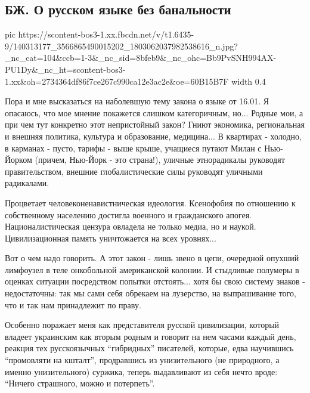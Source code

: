  
 
 
 
 

\subsection{БЖ. О русском языке без банальности}
\label{sec:18_01_2021.fb.bilchenko_evgenia.1.mova_jazyk}

\ifcmt
  pic https://scontent-bos3-1.xx.fbcdn.net/v/t1.6435-9/140313177_3566865490015202_1803062037982538616_n.jpg?_nc_cat=104&ccb=1-3&_nc_sid=8bfeb9&_nc_ohc=Bb9PvSNH994AX-PU1Dy&_nc_ht=scontent-bos3-1.xx&oh=2734364df86f7ce267c990ca12e3ac2e&oe=60B15B7F
	width 0.4
\fi

Пора и мне высказаться на наболевшую тему закона о языке от 16.01. Я опасаюсь,
что мое мнение покажется слишком категоричным, но... Родные мои, а при чем тут
конкретно этот непристойный закон? Гниют экономика, региональная и внешняя
политика, культура и образование, медицина... В квартирах - холодно, в карманах
- пусто, тарифы - выше крыше, учащиеся путают Милан с Нью-Йорком (причем,
Нью-Йорк - это страна!), уличные этнорадикалы руководят правительством, внешние
глобалистические силы руководят уличными радикалами.  

Процветает человеконенавистническая идеология. Ксенофобия по отношению к
собственному населению достигла военного и гражданского апогея.
Националистическая цензура овладела не только медиа, но и наукой.
Цивилизационная память уничтожается на всех уровнях...

Вот о чем надо говорить. А этот закон - лишь звено в цепи, очередной опухший
лимфоузел в теле онкобольной американской колонии. И стыдливые полумеры в
оценках ситуации посредством попытки отстоять... хотя бы свою систему знаков -
недостаточны: так мы сами себя обрекаем на лузерство, на выпрашивание того, что
и так нам принадлежит по праву.

Особенно поражает меня как представителя русской цивилизации, который владеет
украинским как вторым родным и говорит на нем часами каждый день, реакция тех
русскоязычных \enquote{гибридных} писателей, которые, едва научившись \enquote{промовляти на
кшталт},  продравшись из унизительного (не природного, а именно унизительного)
суржика, теперь выдавливают из себя нечто вроде: \enquote{Ничего страшного, можно и
потерпеть}. 

